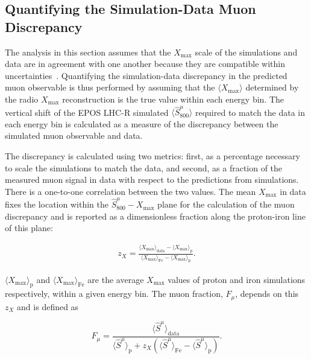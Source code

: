 \subsection{Quantifying the Simulation-Data Muon Discrepancy}\label{ssec:puzzle}


The analysis in this section assumes that the $X_{\text{max}}$ scale of the simulations and data are in agreement with one another because they are compatible within uncertainties~\cite{auger_prd2024_aeraxmax,auger_prl2024_aeraxmax}.
Quantifying the simulation-data discrepancy in the predicted muon observable is thus performed by assuming that the $\langle X_{\text{max}}\rangle$ determined by the radio $X_{\text{max}}$ reconstruction is the true value within each energy bin.
The vertical shift of the EPOS LHC-R simulated $\langle \hat{S}^{\mu}_{800}\rangle$ required to match the data in each energy bin is calculated as a measure of the discrepancy between the simulated muon observable and data.

The discrepancy is calculated using two metrics: first, as a percentage necessary to scale the simulations to match the data, and second, as a fraction of the measured muon signal in data with respect to the predictions from simulations.
There is a one-to-one correlation between the two values.
The mean $X_{\text{max}}$ in data fixes the location within the $\hat{S}^{\mu}_{800}-X_{\text{max}}$ plane for the calculation of the muon discrepancy and is reported as a dimensionless fraction along the proton-iron line of this plane:

\begin{eqnarray}
  z_{X} = \frac{\langle X_{\text{max}}\rangle_{\text{data}} - \langle X_{\text{max}}\rangle_{\text{p}}}{\langle X_{\text{max}}\rangle_{\text{Fe}} - \langle X_{\text{max}}\rangle_{\text{p}}}. \label{eq:zscale_xmax}
\end{eqnarray}

\noindent
$\langle X_{\text{max}}\rangle_{\text{p}}$ and $\langle X_{\text{max}}\rangle_{\text{Fe}}$ are the average $X_{\text{max}}$ values of proton and iron simulations respectively, within a given energy bin.
The muon fraction, $F_{\mu}$, depends on this $z_{X}$ and is defined as

\begin{equation}
  F_{\mu} = \frac{\langle \hat{S}^{\mu}\rangle_{\text{data}}}{\langle \hat{S}^{\mu}\rangle_{\text{p}} + z_{X} \left(\langle \hat{S}^{\mu}\rangle_{\text{Fe}} - \langle \hat{S}^{\mu}\rangle_{\text{p}}\right)}. \label{eq:f_mu}
\end{equation}

